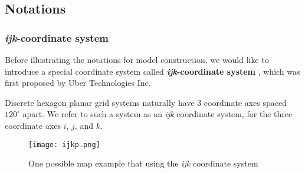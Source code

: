 \documentclass[13pt]{ctexart} %
\begin{document}
\subsection{Notations}
\subsubsection{\textit{ijk}-coordinate system}
Before illustrating the notations for model construction, we would like to introduce a special coordinate system called \textbf{\textit{ijk}-coordinate system} \cite{uber-h3-doc}, which was first proposed by Uber Technologies Inc.

Discrete hexagon planar grid systems naturally have $3$ coordinate axes spaced $120^{\circ}$ apart. We refer to such a system as an \textit{ijk} coordinate system, for the three coordinate axes $i$, $j$, and $k$.

\begin {figure}[h]
\centering %
\texttt{[image: ijkp.png]}
\caption{One possible map example that using the \textit{ijk} coordinate system} %
\end {figure}

\end{document}
